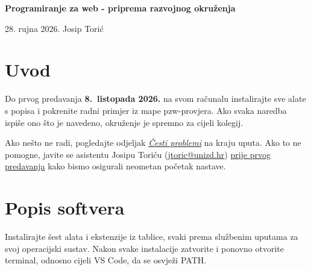 \documentclass[11pt,a4paper]{article}
\newcommand{\code}[1]{{\ttfamily\small #1}}
\begin{document}
{\raggedright{}\color{ink}\fontsize{22}{26}\selectfont\bfseries Programiranje za web - priprema razvojnog okruženja\par}
\vspace{0.3em}
{\color{muted}28. rujna 2026. \textperiodcentered{} Josip Torić\par}
\vspace{0.4em}

\section{Uvod}

Do prvog predavanja \textbf{8.\ listopada 2026.} na svom računalu instalirajte sve alate
s popisa i pokrenite radni primjer iz mape \code{pzw-provjera}. Ako svaka naredba ispiše
ono što je navedeno, okruženje je spremno za cijeli kolegij.

Ako nešto ne radi, pogledajte odjeljak \hyperref[sec:problemi]{\emph{Česti problemi}} na kraju
uputa. Ako to ne pomogne, javite se asistentu Josipu Toriću
(\href{mailto:jtoric@unizd.hr}{jtoric@unizd.hr}) \ul{prije prvog predavanja} kako bismo
osigurali neometan početak nastave.

\section{Popis softvera}

Instalirajte šest alata i ekstenzije iz tablice, svaki prema službenim uputama za svoj
operacijski sustav. Nakon svake instalacije zatvorite i ponovno otvorite terminal, odnosno
cijeli VS Code, da se osvježi PATH.
\end{document}

